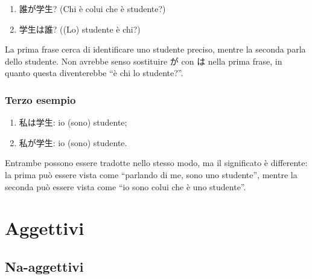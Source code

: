 \documentclass{article}
\let\jap\textjapanese
\begin{document}
                \begin{enumerate}
                    \item \jap{誰が学生?} (Chi è colui che è studente?)
                    \item \jap{学生は誰?} ((Lo) studente è chi?)
                \end{enumerate}

                La prima frase cerca di identificare uno studente preciso, mentre la seconda parla dello studente. Non avrebbe senso
                sostituire \jap{が} con \jap{は} nella prima frase, in quanto questa diventerebbe ``è chi lo studente?''.

            \subsubsection*{Terzo esempio}

                \begin{enumerate}
                    \item \jap{私は学生}: io (sono) studente;
                    \item \jap{私が学生}: io (sono) studente.
                \end{enumerate}

                Entrambe possono essere tradotte nello stesso modo, ma il significato è differente: la prima può essere vista come
                ``parlando di me, sono uno studente'', mentre la seconda può essere vista come ``io sono colui che è uno studente''.
        
    \section{Aggettivi}

        \subsection{Na-aggettivi}
\end{document}
